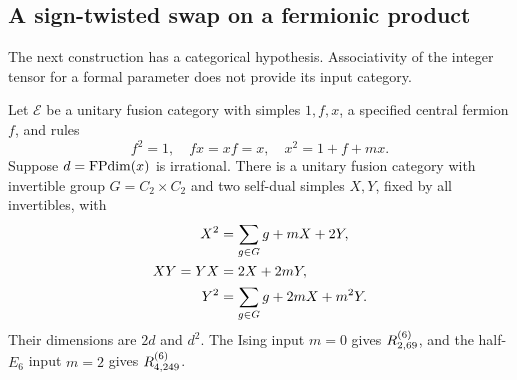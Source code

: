 \subsection{A sign-twisted swap on a fermionic product}\label{sec:sign-swap}
The next construction has a categorical hypothesis. Associativity of the
integer tensor for a formal parameter does not provide its input category.

\begin{theorem}\label{thm:sign-swap}
Let $\mathcal E$ be a unitary fusion category with simples $1,f,x$, a
specified central fermion $f$, and rules
\[
 f^2=1,\quad fx=xf=x,\quad x^2=1+f+mx.
\]
Suppose $d=\operatorname{FPdim}(x)$ is irrational. There is a unitary fusion category
with invertible group $G=C_2\times C_2$ and two self-dual simples $X,Y$,
fixed by all invertibles, with
\begin{align}
 X^2&=\sum_{g\in G}g+mX+2Y,\label{eq:sign-swap}\\
 XY=YX&=2X+2mY,\notag\\
 Y^2&=\sum_{g\in G}g+2mX+m^2Y.\notag
\end{align}
Their dimensions are $2d$ and $d^2$. The Ising input $m=0$ gives
$R^{(6)}_{2,69}$, and the half-$E_6$ input $m=2$ gives $R^{(6)}_{4,249}$.
\end{theorem}
